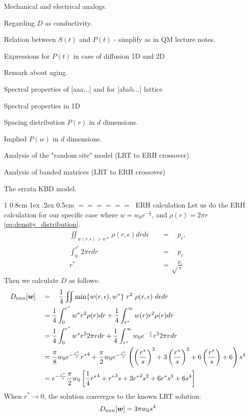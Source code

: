 \documentclass[onecolumn,fleqn,notitlepage,secnumarabic]{revtex4}
\makeatletter
\newcommand{\tbox}[1]{\mbox{\tiny #1}}
\newcommand{\beq}{\begin{eqnarray}}
\newcommand{\eeq}{\end{eqnarray}}
\def\section{%
  \@startsection
    {section}%
    {1}%
    {\z@}%
    {0.8cm \@plus1ex \@minus .2ex}%
    {0.5cm}%
    {\Large\bf $=\!=\!=\!=\!=\!=\;$}%
}%
\makeatother
\begin{document}
Mechanical and electrical analogs.

Regarding $D$ as conductivity.

Relation between $S(t)$ and $P(t)$ - simplify as in QM lecture notes.

Expressions for $P(t)$ in case of diffusion 1D and 2D

Remark about aging.

Spectral properties of [aaa...] and for [abab...] lattice

Spectral properties in 1D

Spacing distribution $P(r)$ in $d$ dimensions.

Implied $P(w)$ in $d$ dimensions. 

Analysis of the "random site" model (LRT to ERH crossover) 

Analysis of banded matrices (LRT to ERH crossover)

The errata KBD model. 



\clearpage

\section{ERH calculation}
Let us do the ERH calculation for our specific case where $w =w_0 e^{-\frac{r}{s}}$, and $\rho(r) = 2\pi r$ \eqref{eq:density_distribution}.
%
\begin{align}
  \iint_{w(r,\epsilon)>w*} \rho(r,\epsilon)drd\epsilon \quad &= \quad p_c, \\
  \int_0^{r^*} 2\pi r dr \quad &=\quad p_c \\
  r^*  &= \sqrt\frac{p_c}{\pi}
\end{align}
%
Then we calculate $D$ as follows:
%
\begin{align}
  D_{\tbox{ERH}}[\bm{w}] \quad&=\quad \frac{1}{4}\iint \min\{w(r,\epsilon),w^*\} \ r^2  \ \rho(r,\epsilon) \ d\epsilon dr \\
  &= \frac{1}{4}\int_0^{r^*} w^* r^2\rho(r) dr  + \frac{1}{4}\int_{r^*}^\infty w(r) r^2\rho(r)dr \\
  &= \frac{1}{4}\int_0^{r^*} w^* r^2 2\pi rdr  + \frac{1}{4}\int_{r^*}^\infty w_0e^{-\frac{r}{s}} r^2 2\pi rdr \\
  &=  \frac{\pi}{8}w_0 e^{-\frac{r^*}{s}}{r^*}^4 + \frac{\pi}{2} w_0  e^{-\frac{r^*}{s}}\left( \left(\frac{r^*}{s}\right)^3 + 3\left(\frac{r^*}{s}\right)^2 + 6\left(\frac{r^*}{s}\right) +6 \right) s^4 \\
  &=  e^{-\frac{r^*}{s}}\frac{\pi}{2} w_0\left[\frac{1}{4}{r^*}^4 +  {r^*}^3 s + 3{r^*}^2 s^2 + 6r^*s^3 +6 s^4  \right]
\end{align}
%
When $r^* \rightarrow 0$, the solution converges to the known LRT solution: 
\beq
  D_{\tbox{ERH}}[\bm{w}] = 3\pi w_0 s^4 
\eeq
\end{document}
